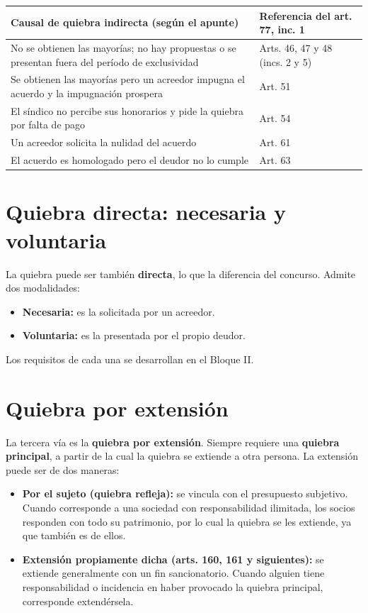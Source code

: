 \documentclass[12pt,oneside]{book}
\begin{document}
\begin{table}[H]
\centering
\begin{tabularx}{\textwidth}{>{\raggedright\arraybackslash}X >{\raggedright\arraybackslash}p{}}
\toprule
\textbf{Causal de quiebra indirecta (según el apunte)} & \textbf{Referencia del art. 77, inc. 1} \\
\midrule
No se obtienen las mayorías; no hay propuestas o se presentan fuera del período de exclusividad & Arts. 46, 47 y 48 (incs. 2 y 5) \\
Se obtienen las mayorías pero un acreedor impugna el acuerdo y la impugnación prospera & Art. 51 \\
El síndico no percibe sus honorarios y pide la quiebra por falta de pago & Art. 54 \\
Un acreedor solicita la nulidad del acuerdo & Art. 61 \\
El acuerdo es homologado pero el deudor no lo cumple & Art. 63 \\
\bottomrule
\end{tabularx}
\end{table}

\section{Quiebra directa: necesaria y voluntaria}

La quiebra puede ser también \textbf{directa}, lo que la diferencia del concurso. Admite dos modalidades:

\begin{itemize}
    \item \textbf{Necesaria:} es la solicitada por un acreedor.
    \item \textbf{Voluntaria:} es la presentada por el propio deudor.
\end{itemize}

Los requisitos de cada una se desarrollan en el Bloque II.

\section{Quiebra por extensión}

La tercera vía es la \textbf{quiebra por extensión}. Siempre requiere una \textbf{quiebra principal}, a partir de la cual la quiebra se extiende a otra persona. La extensión puede ser de dos maneras:

\begin{itemize}
    \item \textbf{Por el sujeto (quiebra refleja):} se vincula con el presupuesto subjetivo. Cuando corresponde a una sociedad con responsabilidad ilimitada, los socios responden con todo su patrimonio, por lo cual la quiebra se les extiende, ya que también es de ellos.
    \item \textbf{Extensión propiamente dicha (arts. 160, 161 y siguientes):} se extiende generalmente con un fin sancionatorio. Cuando alguien tiene responsabilidad o incidencia en haber provocado la quiebra principal, corresponde extendérsela.
\end{itemize}
\end{document}
